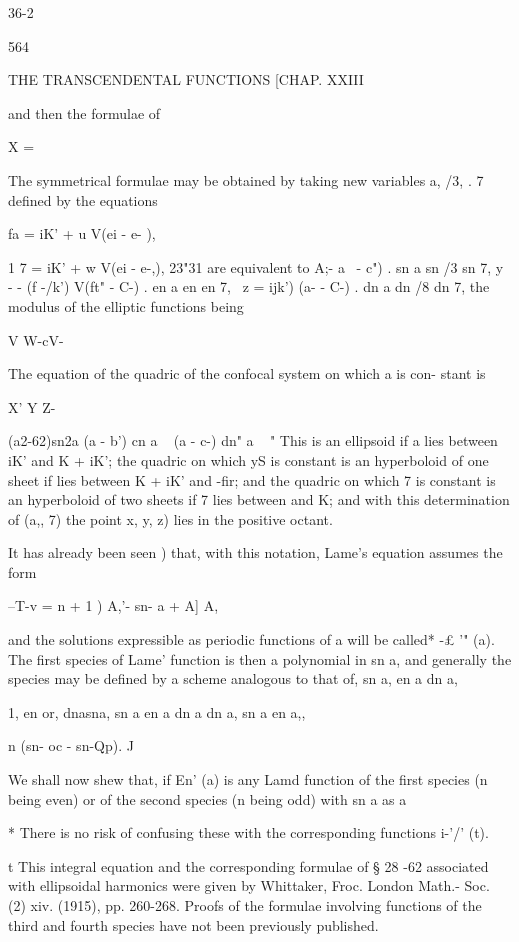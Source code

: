 {{{{{{{36-2

564

THE TRANSCENDENTAL FUNCTIONS [CHAP. XXIII

and then the formulae of

X =

The symmetrical formulae may be obtained by taking new variables a,
/3, . 7 defined by the equations

fa = iK' + u V(ei - e- ),

1 7 = iK' + w V(ei - e-,), 23"31 are equivalent to A;- \/ a~ - c") .
sn a sn /3 sn 7, y - - (f -/k') V(ft" - C-) . en a en en 7, \ z =
ijk') \/(a- - C-) . dn a dn /8 dn 7, the modulus of the elliptic
functions being

V W-cV-

The equation of the quadric of the confocal system on which a is con-
stant is

X' Y Z-

(a2-62)sn2a (a - b') cn a ~ (a - c-) dn" a ~ " This is an ellipsoid if
a lies between iK' and K + iK'; the quadric on which yS is constant
is an hyperboloid of one sheet if lies between K + iK' and -fir; and
the quadric on which 7 is constant is an hyperboloid of two sheets if
7 lies between and K; and with this determination of (a,, 7) the
point x, y, z) lies in the positive octant.

It has already been seen ) that, with this notation, Lame's
equation assumes the form

--T-v = n + 1 ) A,'- sn- a + A] A,

and the solutions expressible as periodic functions of a will be
called* -£ '" (a). The first species of Lame' function is then a
polynomial in sn a, and generally the species may be defined by a
scheme analogous to that of, sn a, en a dn a,

1, en or, dnasna, sn a en a dn a dn a, sn a en a,,

n (sn- oc - sn-Qp). J


We shall now shew that, if En' (a) is any Lamd function of the first
species (n being even) or of the second species (n being odd) with sn
a as a

* There is no risk of confusing these with the corresponding functions
i-'/' (t).

t This integral equation and the corresponding formulae of § 28 -62
associated with ellipsoidal harmonics were given by Whittaker, Froc.
London Math.- Soc. (2) xiv. (1915), pp. 260-268. Proofs of the
formulae involving functions of the third and fourth species have not
been previously published.

}}}}}}}
